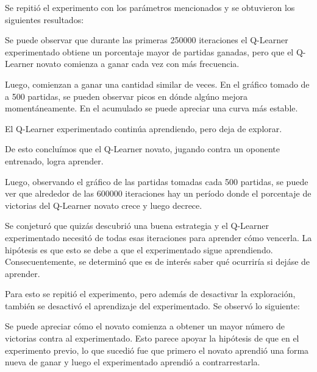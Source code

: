 Se repitió el experimento con los parámetros mencionados y se obtuvieron los siguientes resultados:


Se puede observar que durante las primeras 250000 iteraciones el Q-Learner experimentado obtiene un porcentaje mayor de partidas ganadas, pero que el Q-Learner novato comienza a ganar cada vez con más frecuencia.

Luego, comienzan a ganar una cantidad similar de veces. En el gráfico tomado de a 500 partidas, se pueden observar picos en dónde algúno mejora momentáneamente. En el acumulado se puede apreciar una curva más estable.

El Q-Learner experimentado continúa aprendiendo, pero deja de explorar.

De esto concluímos que el Q-Learner novato, jugando contra un oponente entrenado, logra aprender.

Luego, observando el gráfico de las partidas tomadas cada 500 partidas, se puede ver que alrededor de las 600000 iteraciones hay un período donde el porcentaje de victorias del Q-Learner novato crece y luego decrece.

Se conjeturó que quizás descubrió una buena estrategia y el Q-Learner experimentado necesitó de todas esas iteraciones para aprender cómo vencerla. La hipótesis es que esto se debe a que el experimentado sigue aprendiendo.
Consecuentemente, se determinó que es de interés saber qué ocurriría si dejáse de aprender.

Para esto se repitió el experimento, pero además de desactivar la exploración, también se desactivó el aprendizaje del experimentado. Se observó lo siguiente:


Se puede apreciar cómo el novato comienza a obtener un mayor número de victorias contra al experimentado. Esto parece apoyar la hipótesis de que en el experimento previo, lo que sucedió fue que primero el novato aprendió una forma nueva de ganar y luego el experimentado aprendió a contrarrestarla.\\

